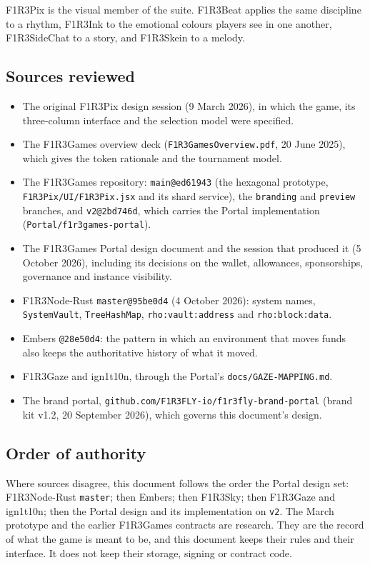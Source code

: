 \documentclass[11pt,a4paper]{article}
\newcommand{\code}[1]{\texttt{#1}}
\begin{document}
F1R3Pix is the visual member of the suite. F1R3Beat applies the same discipline to a rhythm,
F1R3Ink to the emotional colours players see in one another, F1R3SideChat to a story, and
F1R3Skein to a melody.

\subsection{Sources reviewed}

\begin{itemize}[leftmargin=1.2em,itemsep=2pt]
\item The original F1R3Pix design session (9 March 2026), in which the game, its three-column
  interface and the selection model were specified.
\item The F1R3Games overview deck (\code{F1R3GamesOverview.pdf}, 20 June 2025), which gives
  the token rationale and the tournament model.
\item The F1R3Games repository: \code{main@ed61943} (the hexagonal prototype,
  \code{F1R3Pix/UI/F1R3Pix.jsx} and its shard service), the \code{branding} and \code{preview}
  branches, and \code{v2@2bd746d}, which carries the Portal implementation
  (\code{Portal/f1r3games-portal}).
\item The F1R3Games Portal design document and the session that produced it (5 October 2026),
  including its decisions on the wallet, allowances, sponsorships, governance and instance
  visibility.
\item F1R3Node-Rust \code{master@95be0d4} (4 October 2026): system names, \code{SystemVault},
  \code{TreeHashMap}, \code{rho:vault:address} and \code{rho:block:data}.
\item Embers \code{@28e50d4}: the pattern in which an environment that moves funds also keeps
  the authoritative history of what it moved.
\item F1R3Gaze and ign1t10n, through the Portal's \code{docs/GAZE-MAPPING.md}.
\item The brand portal, \code{github.com/F1R3FLY-io/f1r3fly-brand-portal} (brand kit v1.2,
  20 September 2026), which governs this document's design.
\end{itemize}

\subsection{Order of authority}

Where sources disagree, this document follows the order the Portal design set: F1R3Node-Rust
\code{master}; then Embers; then F1R3Sky; then F1R3Gaze and ign1t10n; then the Portal design
and its implementation on \code{v2}. The March prototype and the earlier F1R3Games contracts
are research. They are the record of what the game is meant to be, and this document keeps
their rules and their interface. It does not keep their storage, signing or contract code.
\end{document}
